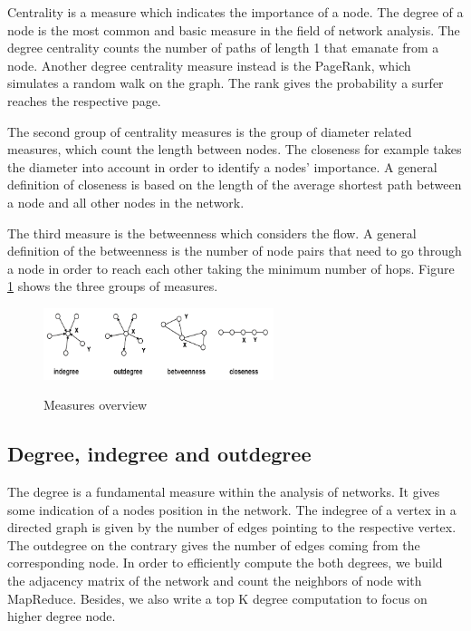 Centrality is a measure which indicates the importance of a node. The degree of a node is the most common and basic measure in the field of network analysis. The degree centrality counts the number of paths of length 1 that emanate from a node. Another degree centrality measure instead is the PageRank, which simulates a random walk on the graph. The rank gives the probability a surfer reaches the respective page. 

The second group of centrality measures is the group of diameter related measures, which count the length between nodes. The closeness for example takes the diameter into account in order to identify a nodes’ importance. A general definition of closeness is based on the length of the average shortest path between a node and all other nodes in the network. 

The third measure is the betweenness which considers the flow. A general definition of the betweenness is the number of node pairs that need to go through a node in order to reach each other taking the minimum number of hops. Figure \ref{fig1} shows the three groups of measures.

\begin{figure}[H]
	\begin{center}
		\label{fig1}		
		\includegraphics[width=0.6\textwidth]{fig1}	
		\caption{Measures overview}	
	\end{center}
\end{figure}

\subsection{Degree, indegree and outdegree}
The degree is a fundamental measure within the analysis of networks. It gives some indication of a nodes position in the network. The indegree of a vertex in a directed graph is given by the number of edges pointing to the respective vertex. The outdegree on the contrary gives the number of edges coming from the corresponding node. In order to efficiently compute the both degrees, we build the adjacency matrix of the network and count the neighbors of node with MapReduce. Besides, we also write a top K degree computation to focus on higher degree node.


